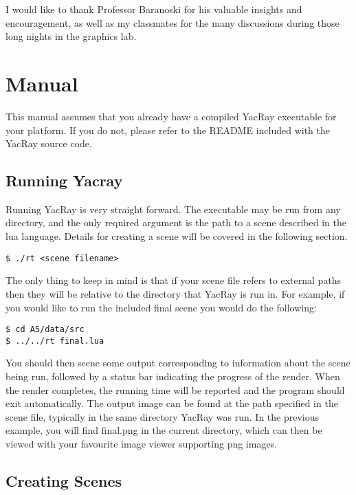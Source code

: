 \documentclass[12pt]{article}
\begin{document}
I would like to thank Professor Baranoski for his valuable insights and encouragement, as well as my classmates for the many discussions during those long nights in the graphics lab.

\newpage

\section{Manual}

This manual assumes that you already have a compiled YacRay executable for your platform. If you do not, please refer to the README included with the YacRay source code.

\subsection{Running Yacray}

Running YacRay is very straight forward. The executable may be run from any directory, and the only required argument is the path to a scene described in the lua language. Details for creating a scene will be covered in the following section.

\begin{verbatim}
$ ./rt <scene filename>
\end{verbatim}

The only thing to keep in mind is that if your scene file refers to external paths then they will be relative to the directory that YacRay is run in. For example, if you would like to run the included final scene you would do the following:

\begin{verbatim}
$ cd A5/data/src
$ ../../rt final.lua
\end{verbatim}

You should then scene some output corresponding to information about the scene being run, followed by a status bar indicating the progress of the render. When the render completes, the running time will be reported and the program should exit automatically. The output image can be found at the path specified in the scene file, typically in the same directory YacRay was run. In the previous example, you will find final.png in the current directory, which can then be viewed with your favourite image viewer supporting png images.


\subsection{Creating Scenes}
\end{document}
